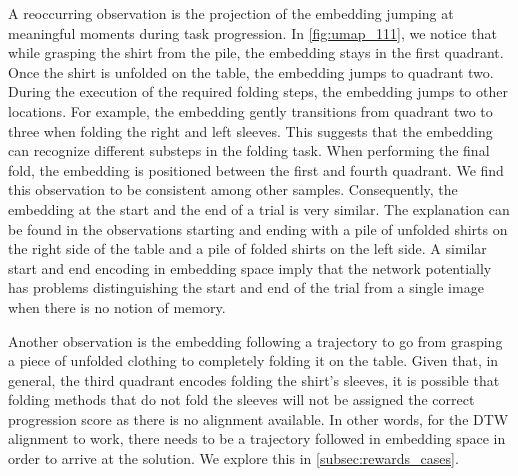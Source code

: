 \documentclass[\home/main.tex]{subfiles}
\begin{document}
A reoccurring observation is the projection of the embedding jumping at meaningful moments during task progression. In \cref{fig:umap_111}, we notice that while grasping the shirt from the pile, the embedding stays in the first quadrant. Once the shirt is unfolded on the table, the embedding jumps to quadrant two. During the execution of the required folding steps, the embedding jumps to other locations. For example, the embedding gently transitions from quadrant two to three when folding the right and left sleeves. This suggests that the embedding can recognize different substeps in the folding task. When performing the final fold, the embedding is positioned between the first and fourth quadrant. We find this observation to be consistent among other samples. Consequently, the embedding at the start and the end of a trial is very similar. The explanation can be found in the observations starting and ending with a pile of unfolded shirts on the right side of the table and a pile of folded shirts on the left side. A similar start and end encoding in embedding space imply that the network potentially has problems distinguishing the start and end of the trial from a single image when there is no notion of memory.

Another observation is the embedding following a trajectory to go from grasping a piece of unfolded clothing to completely folding it on the table. Given that, in general, the third quadrant encodes folding the shirt's sleeves, it is possible that folding methods that do not fold the sleeves will not be assigned the correct progression score as there is no alignment available. In other words, for the DTW alignment to work, there needs to be a trajectory followed in embedding space in order to arrive at the solution. We explore this in \cref{subsec:rewards_cases}.
\end{document}
